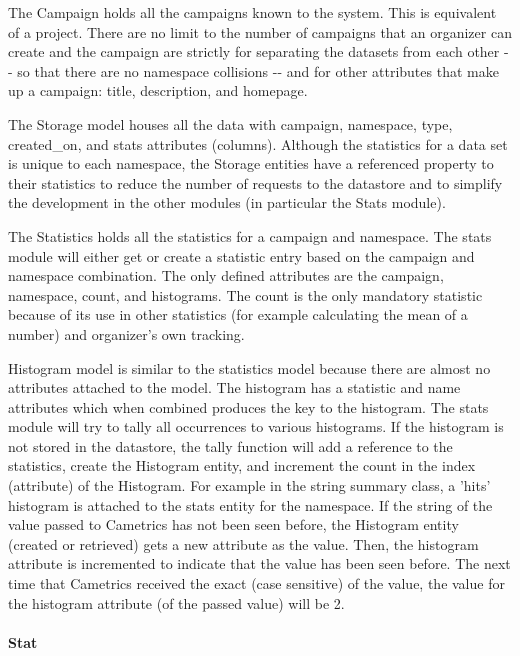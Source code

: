 \documentclass[10pt,a4paper,english]{article}
\begin{document}
The Campaign holds all the campaigns known to the system. This is equivalent of a project. There are no limit to the number of campaigns that an organizer can create and the campaign are strictly for separating the datasets from each other -{}- so that there are no namespace collisions -{}- and for other attributes that make up a campaign: title, description, and homepage.

The Storage model houses all the data with campaign, namespace, type, created{\_}on, and stats attributes (columns). Although the statistics for a data set is unique to each namespace, the Storage entities have a referenced property to their statistics to reduce the number of requests to the datastore and to simplify the development in the other modules (in particular the Stats module).

The Statistics holds all the statistics for a campaign and namespace. The stats module will either get or create a statistic entry based on the campaign and namespace combination. The only defined attributes are the campaign, namespace, count, and histograms. The count is the only mandatory statistic because of its use in other statistics (for example calculating the mean of a number) and organizer's own tracking.

Histogram model is similar to the statistics model because there are almost no attributes attached to the model. The histogram has a statistic and name attributes which when combined produces the key to the histogram. The stats module will try to tally all occurrences to various histograms. If the histogram is not stored in the datastore, the tally function will add a reference to the statistics, create the Histogram entity, and increment the count in the index (attribute) of the Histogram. For example in the string summary class, a 'hits' histogram is attached to the stats entity for the namespace. If the string of the value passed to Cametrics has not been seen before, the Histogram entity (created or retrieved) gets a new attribute as the value. Then, the histogram attribute is incremented to indicate that the value has been seen before. The next time that Cametrics received the exact (case sensitive) of the value, the value for the histogram attribute (of the passed value) will be 2.



\hypertarget{stat}{}
\paragraph*{Stat}
\label{stat}
\end{document}
